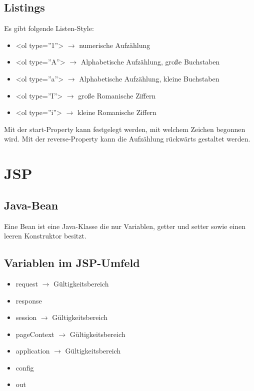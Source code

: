 \documentclass[11pt]{article}
\begin{document}
		
			\newpage
	
	
		
			
			
		\subsection{Listings}
		
			Es gibt folgende Listen-Style:
			
			\begin{itemize}
				\item <ol type=''1''> $\rightarrow$ numerische Aufzählung
				\item <ol type=''A''> $\rightarrow$ Alphabetische Aufzählung, große Buchstaben
				\item <ol type=''a''> $\rightarrow$ Alphabetische Aufzählung, kleine Buchstaben
				\item <ol type=''I''> $\rightarrow$ große Romanische Ziffern
				\item <ol type=''i''> $\rightarrow$ kleine Romanische Ziffern
			\end{itemize}
			
			Mit der start-Property kann festgelegt werden, mit welchem Zeichen begonnen wird. \newline
			Mit der reverse-Property kann die Aufzählung rückwärts gestaltet werden.
			
	\section{JSP}
	
		\subsection{Java-Bean}
			Eine Bean ist eine Java-Klasse die nur Variablen, getter und setter sowie einen leeren Konstruktor besitzt.
			
		\subsection{Variablen im JSP-Umfeld}
			\begin{itemize}
				\item request $\rightarrow$ Gültigkeitsbereich
				\item response
				\item session $\rightarrow$ Gültigkeitsbereich
				\item pageContext $\rightarrow$ Gültigkeitsbereich
				\item application $\rightarrow$ Gültigkeitsbereich
				\item config
				\item out
			\end{itemize}
		
\end{document}
